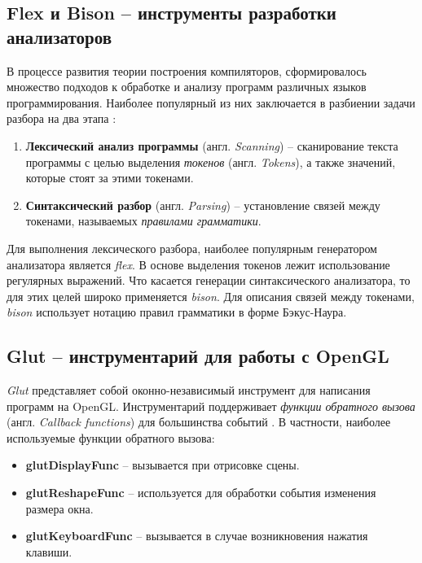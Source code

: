 \documentclass[12pt]{article}
\begin{document}
		\subsection{Flex и Bison -- инструменты разработки анализаторов}
		\hspace{\parindent} В процессе развития теории построения компиляторов, сформировалось множество подходов к обработке и анализу программ различных языков программирования. Наиболее популярный из них заключается в разбиении задачи разбора на два этапа \cite[стр.~21]{flexManual}:
		\begin{enumerate}
			\item {\bf Лексический анализ программы} (англ. {\it Scanning}) -- сканирование текста программы с целью выделения {\it токенов} (англ. {\it Tokens}), а также значений, которые стоят за этими токенами.
			\item {\bf Синтаксический разбор} (англ. {\it Parsing}) -- установление связей между токенами, называемых {\it правилами грамматики}. 
		\end{enumerate}
		
		\indent Для выполнения лексического разбора, наиболее популярным генератором анализатора является {\it flex}. В основе выделения токенов лежит использование регулярных выражений. Что касается генерации синтаксического анализатора, то для этих целей широко применяется {\it bison}. Для описания связей между токенами, {\it bison} использует нотацию правил грамматики в форме Бэкус-Наура.	
		\subsection{Glut -- инструментарий для работы с OpenGL}
		\hspace{\parindent} {\it Glut} представляет собой оконно-независимый инструмент для написания программ на OpenGL. Инструментарий поддерживает {\it функции обратного вызова} (англ. {\it Callback functions}) для большинства событий \cite{glutCallbacks}. В частности, наиболее используемые функции обратного вызова:
		\begin{itemize}
			\item {\bf glutDisplayFunc} -- вызывается при отрисовке сцены.
			\item {\bf glutReshapeFunc} -- используется для обработки события изменения размера окна.
			\item {\bf glutKeyboardFunc} -- вызывается в случае возникновения нажатия клавиши.
		\end{itemize}
		
\end{document}

